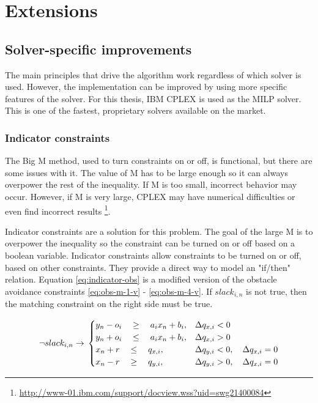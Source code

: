 \chapter{Extensions}
\label{section:extensions}

\section{Solver-specific improvements}
The main principles that drive the algorithm work regardless of which solver is used. However, the implementation can be improved by using more specific features of the solver. For this thesis, IBM CPLEX is used as the MILP solver. This is one of the fastest, proprietary solvers available on the market. 

\subsection{Indicator constraints}
The Big M method, used to turn constraints on or off, is functional, but there are some issues with it. The value of M has to be large enough so it can always overpower the rest of the inequality. If M is too small, incorrect behavior may occur. However, if M is very large, CPLEX may have numerical difficulties or even find incorrect results \footnote{\url{http://www-01.ibm.com/support/docview.wss?uid=swg21400084}}.
\par
Indicator constraints are a solution for this problem. The goal of the large M is to overpower the inequality so the constraint can be turned on or off based on a boolean variable. Indicator constraints allow constraints to be turned on or off, based on other constraints. They provide a direct way to model an "if/then" relation. Equation \ref{eq:indicator-obs} is a modified version of the obstacle avoidance constraints \ref{eq:obs-m-1-v} - \ref{eq:obs-m-4-v}. If $slack_{i,n}$ is not true, then the matching constraint on the right side must be true.

\begin{equation}
\label{eq:indicator-obs}
\neg slack_{i,n} \rightarrow \\
\begin{cases}
y_{n} -  o_i \quad \geq 
\quad a_{i} x_{n} + b_{i},  	
& \Delta q_{x,i} < 0 							 	
 \\
y_{n} + o_i \quad \leq 
\quad a_{i} x_{n} + b_{i},
& \Delta q_{x,i} > 0 							 	
 \\
x_{n} + r \quad \leq
\quad  q_{x,i}, 		
& \Delta q_{y,i} < 0, \quad \Delta q_{x,i} = 0 	
 \\
x_{n} - r \quad \geq 
\quad q_{y,i},  		
& \Delta q_{y,i} > 0, \quad \Delta q_{x,i} = 0 	
\end{cases}
\end{equation}


